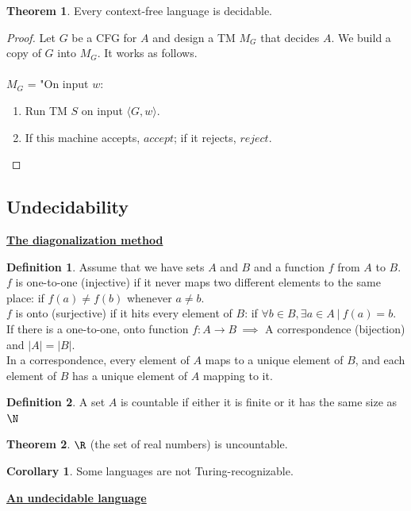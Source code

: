 \documentclass[11pt]{article}
\theoremstyle{definition}
\newtheorem{defn}{Definition}[section]
\newtheorem{thm}{Theorem}[section]
\newtheorem{cor}{Corollary}[thm]
\begin{document}
\begin{thm}
    Every context-free language is decidable.
\end{thm}
\begin{proof}
    Let $G$ be a CFG for $A$ and design a TM $M_G$ that decides $A$. We build a copy of $G$ into $M_G$. It works as follows.\\\\
$M_G$ = "On input $w$:
\begin{enumerate}
    \item Run TM $S$ on input $\langle G, w\rangle$.
    \item If this machine accepts, $accept$; if it rejects, $reject$.
\end{enumerate}
\end{proof}

\subsection{Undecidability}
\textbf{\underline{The diagonalization method}}
\begin{defn}
Assume that we have sets $A$ and $B$ and a function $f$ from $A$ to $B$.\\
$f$ is one-to-one (injective) if it never maps two different elements to the same place: if $f(a)\neq f(b)$ whenever $a\neq b$.\\
$f$ is onto (surjective) if it hits every element of $B$: if $\forall b\in B, \exists a\in A\ |\ f(a)=b$.\\
If there is a one-to-one, onto function $f:A\to B\ \implies$ A correspondence (bijection) and $|A| = |B|$.\\
In a correspondence, every element of $A$ maps to a unique element of $B$, and each element of $B$ has a unique element of $A$ mapping to it.
\end{defn}
\begin{defn}
A set $A$ is countable if either it is finite or it has the same size as $\N$
\end{defn}
\begin{thm}
    $\R$ (the set of real numbers) is uncountable.
\end{thm}
\begin{cor}
    Some languages are not Turing-recognizable.
\end{cor}
\textbf{\underline{An undecidable language}}
\end{document}

